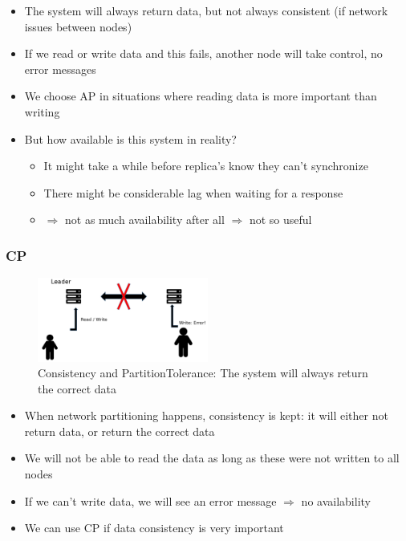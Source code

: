 \documentclass{article}
\begin{document}
\begin{itemize}
    \item The system will always return data, but not always consistent (if network issues between nodes)
    \item If we read or write data and this fails, another node will take control, no error messages
    \item We choose AP in situations where reading data is more important than writing
    \item But how available is this system in reality?
    \begin{itemize}
        \item It might take a while before replica's know they can't synchronize
        \item There might be considerable lag when waiting for a response
        \item $\Rightarrow$ not as much availability after all $\Rightarrow$ not so useful
    \end{itemize}
\end{itemize}


\subsubsection{CP}

\begin{figure}[H]
    \centering
    \includegraphics[width=0.5\textwidth]{cap-theorem-cp.png}
    \caption{Consistency and PartitionTolerance: The system will always return the correct data}
\end{figure}

\begin{itemize}
    \item When network partitioning happens, consistency is kept: it will either not return data, or return the correct data
    \item We will not be able to read the data as long as these were not written to all nodes
    \item If we can't write data, we will see an error message $\Rightarrow$ no availability
    \item We can use CP if data consistency is very important
\end{itemize}
\end{document}
